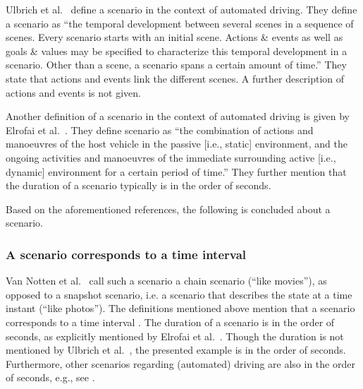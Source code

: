 Ulbrich et al.\ \cite{ulbrich2015} define a scenario in the context of automated driving. They define a scenario as ``the temporal development between several scenes in a sequence of scenes. Every scenario starts with an initial scene. Actions \& events as well as goals \& values may be specified to characterize this temporal development in a scenario. Other than a scene, a scenario spans a certain amount of time.'' They state that actions and events link the different scenes. A further description of actions and events is not given.

Another definition of a scenario in the context of automated driving is given by Elrofai et al.\ \cite{elrofai2016scenario}. They define scenario as ``the combination of actions and manoeuvres of the host vehicle in the passive [i.e., static] environment, and the ongoing activities and manoeuvres of the immediate surrounding active [i.e., dynamic] environment for a certain period of time.'' They further mention that the duration of a scenario typically is in the order of seconds.

Based on the aforementioned references, the following is concluded about a scenario.

\subsubsection{A scenario corresponds to a time interval}
Van Notten et al.\ \cite{vannotten2003updated} call such a scenario a chain scenario (``like movies''), as opposed to a snapshot scenario, i.e. a scenario that describes the state at a time instant (``like photos''). The definitions mentioned above mention that a scenario corresponds to a time interval \cite{go2004blind, geyer2014, ulbrich2015, elrofai2016scenario}. The duration of a scenario is in the order of seconds, as explicitly mentioned by Elrofai et al.\ \cite{elrofai2016scenario}. Though the duration is not mentioned by Ulbrich et al.\ \cite{ulbrich2015}, the presented example is in the order of seconds. Furthermore, other scenarios regarding (automated) driving are also in the order of seconds, e.g., see \cite{gietelink2006development, zofka2015datadrivetrafficscenarios, roesener2017comprehensive, karaduman2013interactivebehavior, hulshof2013autonomous, englund2016grand}.

